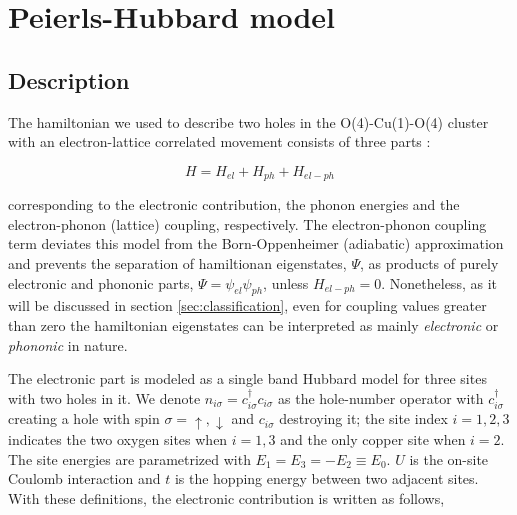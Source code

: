 \chapter{Peierls-Hubbard model}
\label{chap:model}



\section{Description}

The hamiltonian we used to describe two holes in the O(4)-Cu(1)-O(4) cluster with an electron-lattice correlated movement consists of three parts \cite{Salkola1994}:

\begin{equation}\label{eq:full-hamiltonian}
H = H_{el} + H_{ph} + H_{el-ph}
\end{equation}

\noindent corresponding to the electronic contribution, the phonon energies and the electron-phonon (lattice) coupling, respectively. 
The electron-phonon coupling term deviates this model from the Born-Oppenheimer (adiabatic) approximation and prevents the separation of hamiltionan eigenstates, $\Psi$, as products of purely electronic and phononic parts, $\Psi=\psi_{el}\psi_{ph}$, unless $H_{el-ph}=0$.
Nonetheless, as it will be discussed in section \ref{sec:classification}, even for coupling values greater than zero the hamiltonian eigenstates can be interpreted as mainly \textit{electronic} or \textit{phononic} in nature.

The electronic part is modeled as a single band Hubbard model for three sites with two holes in it. 
We denote $n_{i\sigma}=c_{i\sigma}^\dagger c_{i\sigma}$ as the hole-number operator with $c_{i\sigma}^\dagger$ creating a hole with spin $\sigma = \uparrow, \downarrow$ and $c_{i\sigma}$ destroying it; the site index $i=1,2,3$ indicates the two oxygen sites when  $i=1,3$ and the only copper site when $i=2$. 
The site energies are parametrized with $E_1=E_3=-E_2 \equiv E_0$. 
$U$ is the on-site Coulomb interaction and $t$ is the hopping energy between two adjacent sites. 
With these definitions, the electronic contribution is written as follows,

